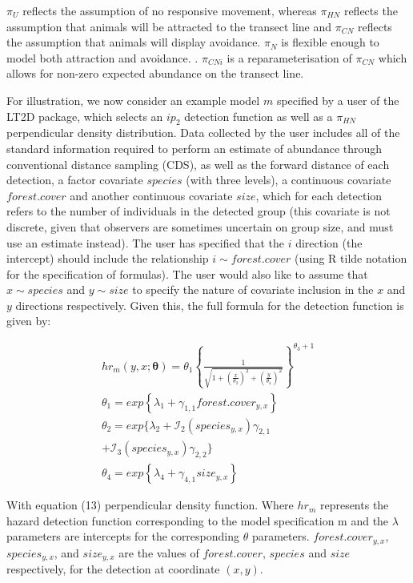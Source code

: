 \documentclass[11pt]{article}
\begin{document}
\begin{multicols}{2}
$\pi_U$ reflects the assumption of no responsive movement, whereas $\pi_{HN}$ reflects the assumption that animals will be attracted to the transect line and $\pi_{CN}$ reflects the assumption that animals will display avoidance. $\pi_N$ is flexible enough to model both attraction and avoidance. \cite{Borchers}. $\pi_{CNi}$ is a reparameterisation of $\pi_{CN}$ which allows for non-zero expected abundance on the transect line.

For illustration, we now consider an example model $m$ specified by a user of the LT2D package, which selects an $ip_2$ detection function as well as a $\pi_{HN}$ perpendicular density distribution. Data collected by the user includes all of the standard information required to perform an estimate of abundance through conventional distance sampling (CDS), as well as the forward distance of each detection, a factor covariate $species$ (with three levels), a continuous covariate $forest.cover$ and another continuous covariate $size$, which for each detection refers to the number of individuals in the detected group (this covariate is not discrete, given that observers are sometimes uncertain on group size, and must use an estimate instead). The user has specified that the $i$ direction (the intercept) should include the relationship $i\sim forest.cover$ (using R tilde notation for the specification of formulas). The user would also like to assume that $x\sim species$ and $y\sim size$ to specify the nature of covariate inclusion in the $x$ and $y$ directions respectively. Given this, the full formula for the detection function is given by:

\begin{multline}
hr_m\left(y,x;\boldsymbol{\theta}\right) = \theta_1\left\{\frac{1}{\sqrt{1+\left(\frac{x}{\theta_2}\right)^2+\left(\frac{y}{\theta_4}\right)^2}}\right\}^{\theta_3 + 1}\\\theta_1=exp\left\{{\lambda_1 + \gamma_{1,1}forest.cover_{y,x}}\right\} \\\theta_2 = exp\{\lambda_2 + \mathcal{I}_2\left(species_{y,x}\right)\gamma_{2,1}\\ +\mathcal{I}_3\left(species_{y,x}\right)\gamma_{2,2}\}  \\\theta_4 = exp\left\{\lambda_4 + \gamma_{4,1}size_{y,x}\right\}
\end{multline}

With equation (13) perpendicular density function. Where $hr_m$ represents the hazard detection function corresponding to the model specification m and the $\lambda$ parameters are intercepts for the corresponding $\theta$ parameters. $forest.cover_{y,x}$, $species_{y,x}$, and $size_{y,x}$ are the values of $forest.cover$, $species$ and $size$ respectively, for the detection at coordinate $(x,y)$.


\end{multicols}
\end{document}
